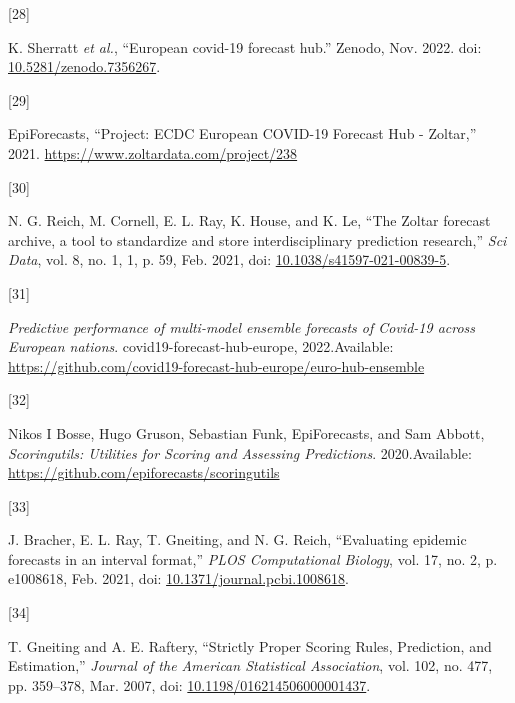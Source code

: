 \documentclass[
]{article}
\newlength{\cslhangindent}
\newlength{\csllabelwidth}
\newlength{\cslentryspacingunit} %
\newenvironment{CSLReferences}[2] %
 {%
  \setlength{\parindent}{0pt}
  \ifodd #1
  \let\oldpar\par
  \def\par{\hangindent=\cslhangindent\oldpar}
  \fi
  \setlength{\parskip}{#2\cslentryspacingunit}
 }%
 {}
\newcommand{\CSLLeftMargin}[1]{\parbox[t]{\csllabelwidth}{#1}}
\newcommand{\CSLRightInline}[1]{\parbox[t]{\linewidth - \csllabelwidth}{#1}\break}
\begin{document}
\begin{CSLReferences}{0}{0}
\leavevmode{}%
\CSLLeftMargin{{[}28{]} }
\CSLRightInline{K. Sherratt \emph{et al.}, {``European covid-19 forecast hub.''} Zenodo, Nov. 2022. doi: \href{https://doi.org/10.5281/zenodo.7356267}{10.5281/zenodo.7356267}.}

\leavevmode{}%
\CSLLeftMargin{{[}29{]} }
\CSLRightInline{EpiForecasts, {``Project: {ECDC European COVID-19 Forecast Hub} - {Zoltar},''} 2021. \url{https://www.zoltardata.com/project/238}}

\leavevmode{}%
\CSLLeftMargin{{[}30{]} }
\CSLRightInline{N. G. Reich, M. Cornell, E. L. Ray, K. House, and K. Le, {``The {Zoltar} forecast archive, a tool to standardize and store interdisciplinary prediction research,''} \emph{Sci Data}, vol. 8, no. 1, 1, p. 59, Feb. 2021, doi: \href{https://doi.org/10.1038/s41597-021-00839-5}{10.1038/s41597-021-00839-5}.}

\leavevmode{}%
\CSLLeftMargin{{[}31{]} }
\CSLRightInline{\emph{Predictive performance of multi-model ensemble forecasts of {Covid-19} across {European} nations}. {covid19-forecast-hub-europe}, 2022.Available: \url{https://github.com/covid19-forecast-hub-europe/euro-hub-ensemble}}

\leavevmode{}%
\CSLLeftMargin{{[}32{]} }
\CSLRightInline{Nikos I Bosse, Hugo Gruson, Sebastian Funk, EpiForecasts, and Sam Abbott, \emph{Scoringutils: {Utilities} for {Scoring} and {Assessing Predictions}}. 2020.Available: \url{https://github.com/epiforecasts/scoringutils}}

\leavevmode{}%
\CSLLeftMargin{{[}33{]} }
\CSLRightInline{J. Bracher, E. L. Ray, T. Gneiting, and N. G. Reich, {``Evaluating epidemic forecasts in an interval format,''} \emph{PLOS Computational Biology}, vol. 17, no. 2, p. e1008618, Feb. 2021, doi: \href{https://doi.org/10.1371/journal.pcbi.1008618}{10.1371/journal.pcbi.1008618}.}

\leavevmode{}%
\CSLLeftMargin{{[}34{]} }
\CSLRightInline{T. Gneiting and A. E. Raftery, {``Strictly {Proper Scoring Rules}, {Prediction}, and {Estimation},''} \emph{Journal of the American Statistical Association}, vol. 102, no. 477, pp. 359--378, Mar. 2007, doi: \href{https://doi.org/10.1198/016214506000001437}{10.1198/016214506000001437}.}


\end{CSLReferences}
\end{document}
